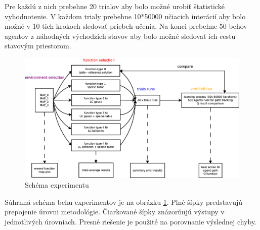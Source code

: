 Pre každú z nich prebehne 20 trialov aby bolo možné urobiť štatistické vyhodnotenie.
V každom trialy prebehne 10*50000 učiacich interácií aby bolo možné v 10 tich krokoch sledovať
priebeh učenia. Na konci prebehne 50 behov agentov z náhodných východzich stavov aby bolo
možné sledovať ich cestu stavovým priestorom.

\begin{figure}[!htb]
\center
\includegraphics[scale=.3]{../diagrams/experiment_map_q_learning.eps}
\caption{Schéma experimentu}
\label{img:experiment_schem}
\end{figure}

Súhrnná schéma behu experimentov je na obrázku \ref{img:experiment_schem}.
Plné šípky predstavujú prepojenie úrovni metodológie. Čiarkované šípky znázorňujú
výstupy v jednotlivých úrovniach. Presné riešenie je použité na porovnanie výslednej chyby.




